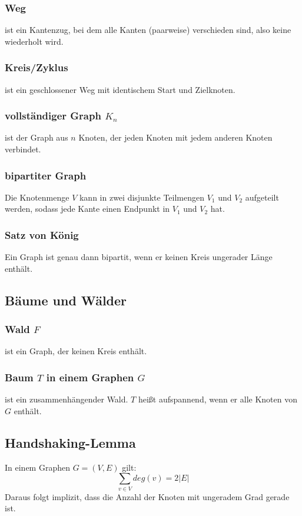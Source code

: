 \documentclass[10pt,a4paper,landscape]{article}
\begin{document}
\begin{multicols*}{2}
    \subsubsection*{ Weg } ist ein Kantenzug, bei dem alle Kanten (paarweise) verschieden sind, also keine wiederholt wird.
    \subsubsection*{ Kreis/Zyklus } ist ein geschlossener Weg mit identischem Start und Zielknoten.

    \subsubsection*{ vollständiger Graph $K_{n}$ } ist der Graph aus $n$ Knoten, der jeden Knoten mit jedem anderen Knoten verbindet.
    \subsubsection*{ bipartiter Graph } Die Knotenmenge $V$ kann in zwei disjunkte Teilmengen $V_1$ und $V_2$ aufgeteilt werden, sodass jede Kante einen 
    Endpunkt in $V_1$ und $V_2$ hat.
    \subsubsection*{ Satz von König }
    Ein Graph ist genau dann bipartit, wenn er keinen Kreis ungerader Länge enthält.

    \subsection{ Bäume und Wälder }
    \subsubsection*{ Wald $F$ } ist ein Graph, der keinen Kreis enthält.
    \subsubsection*{ Baum $T$ in einem Graphen $G$ } ist ein zusammenhängender Wald. $T$ heißt aufspannend, wenn er alle Knoten von $G$ enthält. 

    \subsection{ Handshaking-Lemma }
    In einem Graphen $G = (V, E)$ gilt:
    \[ \sum_{v\in V} deg(v) = 2|E| \]
    Daraus folgt implizit, dass die Anzahl der Knoten mit ungeradem Grad gerade ist.


\end{multicols*}
\end{document}
